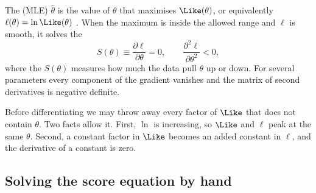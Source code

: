 \begin{workdef}
The  (MLE) $\hat\theta$ is the value of
$\theta$ that maximises $\Like(\theta)$, or equivalently
$\ell(\theta)=\ln\Like(\theta)$ . When the maximum
is inside the allowed range and $\ell$ is smooth, it solves the
\[
  S(\theta)\equiv\frac{\partial\ell}{\partial\theta}=0,
  \qquad \frac{\partial^2\ell}{\partial\theta^2}<0 ,
\]
where the  $S(\theta)$  measures
how much the data pull $\theta$ up or down. For several parameters every
component of the gradient vanishes and the matrix of second derivatives is
negative definite.
\end{workdef}

Before differentiating we may throw away every factor of $\Like$ that does
not contain $\theta$. Two facts allow it. First, $\ln$ is increasing, so
$\Like$ and $\ell$ peak at the same $\theta$. Second, a constant factor in
$\Like$ becomes an added constant in $\ell$, and the derivative of a
constant is zero.

\subsection{Solving the score equation by hand}
\label{3b:sec:mle-hand}

